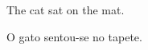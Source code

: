 \documentclass{article}
\begin{document}

The \gls{cat} sat on the \gls{mat}.


O \gls{gato} sentou-se no \gls{tapete}.

\renewcommand*{\glsxtrbookindexname}[1]{%
 \glsxtrifhasfield{prefix}{#1}{\xmakefirstuc\glscurrentfieldvalue\space}{}%
 \glossentryname{#1}%
 \glsxtrifhasfield{see}{#1}{; translations: \glsxtrseelist\glscurrentfieldvalue}{}%
}
\printunsrtglossaries
\end{document}
